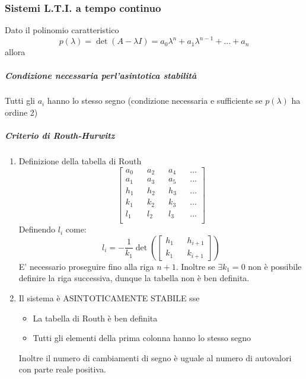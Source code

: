 \documentclass{article}
\begin{document}
	\subsubsection{Sistemi L.T.I. a tempo continuo}
	Dato il polinomio caratteristico
	\begin{equation}
		p(\lambda) = \det(A - \lambda I) = a_0\lambda^n + a_1 \lambda^{n-1} + ... + a_n
	\end{equation}
	allora
	\subparagraph{Condizione necessaria perl'asintotica stabilità}
	Tutti gli $a_i$ hanno lo stesso segno (condizione necessaria e sufficiente se $p(\lambda)$ ha ordine 2)
	\subparagraph*{Criterio di Routh-Hurwitz}
	\begin{enumerate}
		\item Definizione della tabella di Routh
			\begin{equation}
				\begin{bmatrix}
					a_0 && a_2 && a_4 && ... \\
					a_1 && a_3 && a_5 && ... \\
					h_1 && h_2 && h_3 && ... \\
					k_1 && k_2 && k_3 && ... \\
					l_1 && l_2 && l_3 && ...\\
				\end{bmatrix}
			\end{equation}
			Definendo $l_i$ come:
			\begin{equation}
				l_i = -\frac{1}{k_1} \det\left(\begin{bmatrix}
												h_1 && h_{i+1} \\ k_1 && k_{i+1}
											\end{bmatrix}\right)
			\end{equation}
			E' necessario proseguire fino alla riga $n+1$. Inoltre se $\exists k_1 = 0$ non è possibile definire la riga successiva, dunque la tabella non è ben definita.
		\item Il sistema è ASINTOTICAMENTE STABILE sse
			\begin{itemize}
				\item La tabella di Routh è ben definita
				\item Tutti gli elementi della prima colonna hanno lo stesso segno				
			\end{itemize}
			Inoltre il numero di cambiamenti di segno è uguale al numero di autovalori con parte reale positiva.
	\end{enumerate}
\end{document}
